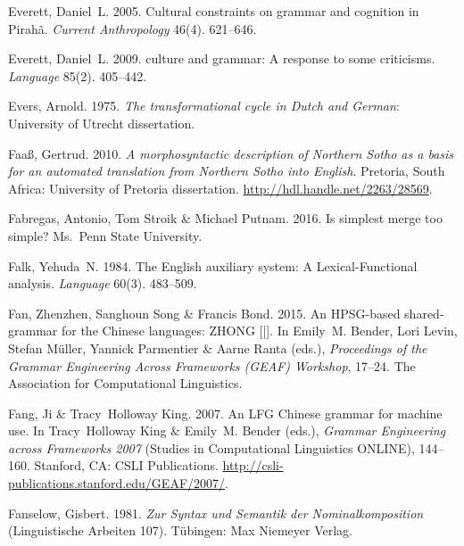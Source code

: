 \begin{thebibliography}{1420}
Everett, Daniel~L. 2005.
\newblock Cultural constraints on grammar and cognition in {Pirah{\~a}}.
\newblock \emph{Current Anthropology} 46(4). 621--646.

Everett, Daniel~L. 2009.
 culture and grammar: {A} response to some criticisms.
\newblock \emph{Language} 85(2). 405--442.

Evers, Arnold. 1975.
\newblock \emph{The transformational cycle in {Dutch} and {German}}: University
  of Utrecht dissertation.

Faa{\ss}, Gertrud. 2010.
\newblock \emph{A morphosyntactic description of {Northern Sotho} as a basis
  for an automated translation from {Northern Sotho} into {English}}.
\newblock Pretoria, South Africa: University of Pretoria dissertation.
\newblock \urlprefix\url{http://hdl.handle.net/2263/28569}.

Fabregas, Antonio, Tom Stroik \& Michael Putnam. 2016.
\newblock Is simplest merge too simple?
\newblock Ms.\ Penn State University.

Falk, Yehuda~N. 1984.
\newblock The {English} auxiliary system: {A} {Lexical-Functional} analysis.
\newblock \emph{Language} 60(3). 483--509.

Fan, Zhenzhen, Sanghoun Song \& Francis Bond. 2015.
\newblock An {HPSG}-based shared-grammar for the {Chinese} languages: {ZHONG
  [|]}.
\newblock In Emily~M. Bender, Lori Levin, Stefan M{\"u}ller, Yannick Parmentier
  \& Aarne Ranta (eds.), \emph{Proceedings of the {Grammar Engineering Across
  Frameworks (GEAF) Workshop}}, 17--24. The Association for Computational
  Linguistics.

Fang, Ji \& Tracy~Holloway King. 2007.
\newblock An {LFG} {Chinese} grammar for machine use.
\newblock In Tracy~Holloway King \& Emily~M. Bender (eds.), \emph{{Grammar
  Engineering across Frameworks 2007}}  (Studies in Computational Linguistics
  ONLINE), 144--160. Stanford, CA: CSLI Publications.
\newblock \urlprefix\url{http://csli-publications.stanford.edu/GEAF/2007/}.

Fanselow, Gisbert. 1981.
\newblock \emph{{Zur Syntax und Semantik der Nominalkomposition}}
  (Linguistische Arbeiten 107).
\newblock T{\"u}bingen: Max Niemeyer Verlag.


\end{thebibliography}
